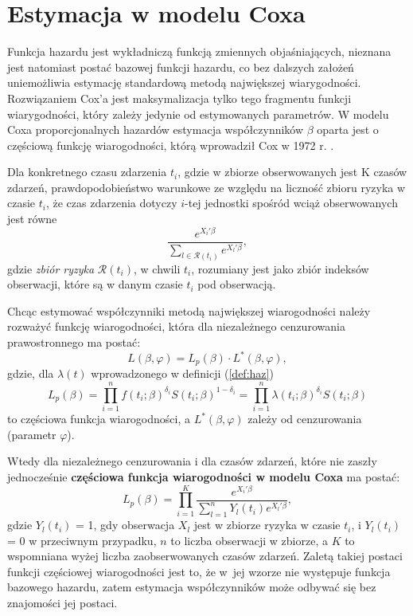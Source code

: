 \section{Estymacja w modelu Coxa}

Funkcja hazardu jest wykładniczą funkcją zmiennych objaśniających, nieznana jest natomiast
postać bazowej funkcji hazardu, co bez dalszych założeń uniemożliwia estymację standardową
metodą największej wiarygodności. Rozwiązaniem Cox’a jest maksymalizacja tylko tego fragmentu funkcji wiarygodności, który zależy jedynie od estymowanych parametrów. W modelu Coxa proporcjonalnych hazardów estymacja współczynników $\beta$ oparta jest o częściową funkcję wiarogodności, którą wprowadził Cox w 1972 r. \cite{cox}. 

Dla konkretnego czasu zdarzenia $t_i$, gdzie w zbiorze obserwowanych jest K czasów zdarzeń, prawdopodobieństwo warunkowe ze względu na liczność zbioru ryzyka w czasie $t_i$, że czas zdarzenia dotyczy $i$-tej jednostki spośród wciąż obserwowanych jest równe
\begin{equation}
\dfrac{e^{X_i'\beta}}{\sum\limits_{l\in \mathscr{R}(t_i)}^{}e^{X_l'\beta}},
\end{equation}
gdzie \textit{zbiór ryzyka} $\mathscr{R}(t_i)$, w chwili $t_i$, rozumiany jest jako zbiór indeksów obserwacji, które są w danym czasie $t_i$ pod obserwacją.

Chcąc estymować współczynniki metodą największej wiarogodności należy rozważyć funkcję wiarogodności, która dla niezależnego cenzurowania prawostronnego ma postać:
\begin{equation}
L(\beta,\varphi) = L_p(\beta)\cdot L^{*}(\beta,\varphi),
\end{equation}
gdzie, dla $\lambda(t)$ wprowadzonego w definicji (\ref{def:haz})
\begin{equation}
L_p(\beta) = \prod\limits_{i=1}^{n}f(t_i;\beta)^{\delta_i}S(t_i;\beta)^{1-\delta_i}=\prod\limits_{i=1}^{n}\lambda(t_i;\beta)^{\delta_i}S(t_i;\beta)
\end{equation}
to częściowa funkcja wiarogodności, a $L^{*}(\beta,\varphi)$ zależy od cenzurowania (parametr $\varphi$).

Wtedy dla niezależnego cenzurowania i dla czasów zdarzeń, które nie zaszły jednocześnie \textbf{częściowa funkcja wiarogodności w modelu Coxa} ma postać:
\begin{equation}
L_p(\beta) = \prod\limits_{i=1}^{K}\dfrac{e^{X_i'\beta}}{\sum\limits_{l=1}^{n}Y_l(t_i)e^{X_l'\beta}},
\end{equation}
gdzie $Y_l(t_i)$ = 1, gdy obserwacja $X_l$ jest w zbiorze ryzyka w czasie $t_i$, i $Y_l(t_i)$ = 0 w przeciwnym przypadku, $n$ to liczba obserwacji w zbiorze, a $K$ to wspomniana wyżej liczba zaobserwowanych czasów zdarzeń. Zaletą takiej postaci funkcji częściowej wiarogodności jest to, że w~jej wzorze nie występuje funkcja bazowego hazardu, zatem estymacja współczynników może odbywać się bez znajomości jej postaci.

